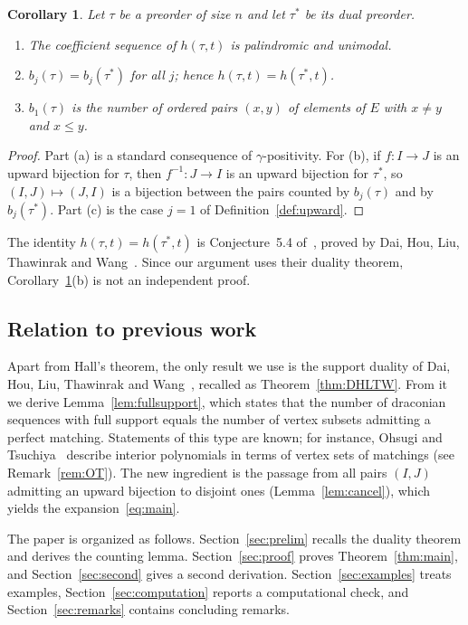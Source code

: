 \documentclass[11pt]{amsart}
\newtheorem{corollary}[theorem]{Corollary}
\theoremstyle{definition}
\theoremstyle{remark}
\numberwithin{equation}{section}
\begin{document}
\begin{corollary}\label{cor:consequences}
Let $\tau$ be a preorder of size $n$ and let $\tau^*$ be its dual preorder.
\begin{enumerate}[label=\textup{(\alph*)}]
\item The coefficient sequence of $h(\tau,t)$ is palindromic and unimodal.
\item $b_j(\tau)=b_j(\tau^*)$ for all $j$; hence $h(\tau,t)=h(\tau^*,t)$.
\item $b_1(\tau)$ is the number of ordered pairs $(x,y)$ of elements of $E$ with $x\ne y$ and $x\le y$.
\end{enumerate}
\end{corollary}

\begin{proof}
Part (a) is a standard consequence of $\gamma$-positivity. For (b), if $f\colon I\to J$ is an upward bijection for $\tau$, then $f^{-1}\colon J\to I$ is an upward bijection for $\tau^*$, so $(I,J)\mapsto(J,I)$ is a bijection between the pairs counted by $b_j(\tau)$ and by $b_j(\tau^*)$. Part (c) is the case $j=1$ of Definition~\ref{def:upward}.
\end{proof}

The identity $h(\tau,t)=h(\tau^*,t)$ is Conjecture~5.4 of~\cite{AC}, proved by Dai, Hou, Liu, Thawinrak and Wang~\cite{DHLTW}. Since our argument uses their duality theorem, Corollary~\ref{cor:consequences}(b) is not an independent proof.

\subsection*{Relation to previous work}
Apart from Hall's theorem, the only result we use is the support duality of Dai, Hou, Liu, Thawinrak and Wang~\cite[Theorem~1.3]{DHLTW}, recalled as Theorem~\ref{thm:DHLTW}. From it we derive Lemma~\ref{lem:fullsupport}, which states that the number of draconian sequences with full support equals the number of vertex subsets admitting a perfect matching. Statements of this type are known; for instance, Ohsugi and Tsuchiya~\cite[Proposition~3.4]{OT} describe interior polynomials in terms of vertex sets of matchings (see Remark~\ref{rem:OT}). The new ingredient is the passage from all pairs $(I,J)$ admitting an upward bijection to disjoint ones (Lemma~\ref{lem:cancel}), which yields the expansion~\eqref{eq:main}.

The paper is organized as follows. Section~\ref{sec:prelim} recalls the duality theorem and derives the counting lemma. Section~\ref{sec:proof} proves Theorem~\ref{thm:main}, and Section~\ref{sec:second} gives a second derivation. Section~\ref{sec:examples} treats examples, Section~\ref{sec:computation} reports a computational check, and Section~\ref{sec:remarks} contains concluding remarks.
\end{document}

